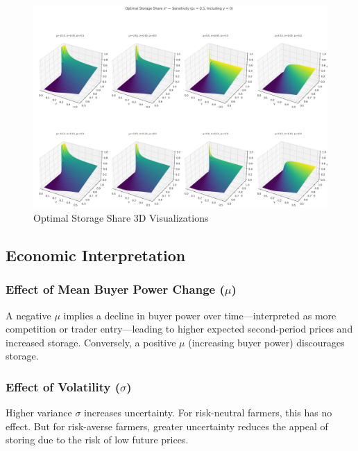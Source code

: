 \documentclass[12pt]{article}
\begin{document}
\begin{figure}[pht]
\centering
\includegraphics[width=\textwidth]{figures/first_p_0.5_s_optimal.png}
\caption{Optimal Storage Share 3D Visualizations}
\label{Figure: 3D optimal storage share}
\end{figure}



\subsection{Economic Interpretation}

\subsubsection{Effect of Mean Buyer Power Change ($\mu$)}
A negative $\mu$ implies a decline in buyer power over time—interpreted as more competition or trader entry—leading to higher expected second-period prices and increased storage. Conversely, a positive $\mu$ (increasing buyer power) discourages storage.


\subsubsection{Effect of Volatility ($\sigma$)}
Higher variance $\sigma$ increases uncertainty. For risk-neutral farmers, this has no effect. But for risk-averse farmers, greater uncertainty reduces the appeal of storing due to the risk of low future prices.
\end{document}

